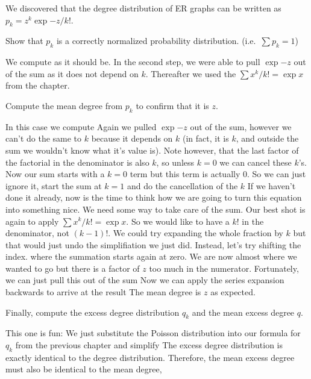 

We discovered that the degree distribution of ER graphs can be written as $p_k=z^{k}\exp{-z}/{k!}$.

\subquestion 
Show that $p_k$ is a correctly normalized probability distribution. (i.e.~$\sum p_k=1$)

\solution
We compute 
as it should be. In the second step, we were able to pull $\exp{-z}$ out of the sum as it does not depend on $k$. Thereafter we used the 
$\sum x^k /k! = \exp{x}$ from the chapter. 

\subquestion
Compute the mean degree from $p_k$ to confirm that it is $z$.

\solution
In this case we compute
Again we pulled $\exp{-z}$ out of the sum, however we can't do the same to $k$ because it depends on $k$ (in fact, it is $k$, and outside the sum we wouldn't know what it's value is). 
Note however, that the last factor of the factorial in the denominator is also $k$, so unless $k=0$ we can cancel these $k$'s. Now our sum starts with a $k=0$ term but this term is actually 0. So we can just ignore it, start the sum at $k=1$ and do the cancellation of the $k$
If we haven't done it already, now is the time to think how we are going to turn this equation into something nice. We need some way to 
take care of the sum. Our best shot is again to apply $\sum x^k/k!=\exp{x}$. So we would like to have a $k!$ in the denominator, not $(k-1)!$. We could try expanding the whole fraction by $k$ but that would just undo the simplifiation we just did. Instead, let's try shifting the index. 
where the summation starts again at zero. We are now almost where we wanted to go but there is a factor of $z$ too much in the numerator. Fortunately, we can just pull this out of the sum
Now we can apply the series expansion backwards to arrive at the result
The mean degree is $z$ as expected. 

\subquestion
Finally, compute the excess degree distribution $q_k$ and the mean excess degree $q$.

\solution
This one is fun: We just substitute the Poisson distribution into our formula for $q_k$ from the previous chapter and simplify
The excess degree distribution is exactly identical to the degree distribution. Therefore, the mean excess degree must also be identical to the mean degree,

